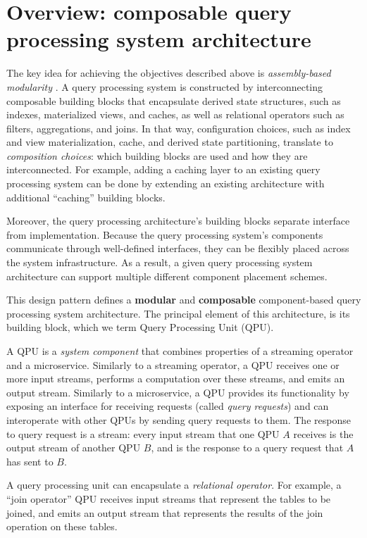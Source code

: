 \section{Overview: composable query processing system architecture}

The key idea for achieving the objectives described above is \textit{assembly-based modularity}
\cite{leclercq:dream, bouget:pleiades}.
A query processing system is constructed by interconnecting composable building blocks
that encapsulate derived state structures, such as indexes, materialized views, and caches,
as well as relational operators such as filters, aggregations, and joins.
In that way, configuration choices, such as index and view materialization, cache, and derived state partitioning,
translate to \textit{composition choices}: which building blocks are used and how they are interconnected.
For example, adding a caching layer to an existing query processing system can be done by extending an existing
architecture with additional ``caching'' building blocks.

Moreover, the query processing architecture's building blocks separate interface from implementation.
Because the query processing system's components communicate through well-defined interfaces,
they can be flexibly placed across the system infrastructure.
As a result, a given query processing system architecture can support multiple different component placement schemes.

\bigskip
\noindent
This design pattern defines a \textbf{modular} and \textbf{composable} component-based query processing system
architecture.
The principal element of this architecture, is its building block, which we term Query Processing Unit (QPU).

A QPU is a \textit{system component} that combines properties of a streaming operator and a microservice.
Similarly to a streaming operator, a QPU receives one or more input streams, performs a computation over these streams,
and emits an output stream.
Similarly to a microservice, a QPU provides its functionality by exposing an interface for receiving requests
(called \textit{query requests})
and can interoperate with other QPUs by sending query requests to them.
The response to query request is a stream:
every input stream that one QPU $A$ receives is the output stream of another QPU $B$, and is the response to a query request
that $A$ has sent to $B$.

\medskip
\noindent
A query processing unit can encapsulate a \textit{relational operator}.
For example, a ``join operator'' QPU receives input streams that represent the tables to be joined,
and emits an output stream that represents the results of the join operation on these tables.

